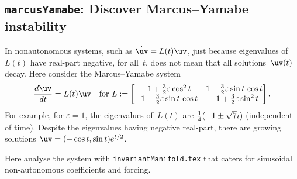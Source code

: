 \subsection{\texttt{marcusYamabe}: Discover Marcus--Yamabe instability}
\label{marcusYamabe}
\localtableofcontents

In {nonautonomous} systems, such as \(\dot{\uv}=L(t)\uv\),
just because eigenvalues of~\(L(t)\) have real-part
negative, for all~\(t\), does not mean that all
solutions~\(\uv(t)\) decay. Here consider the
{Marcus--Yamabe system} \cite[p.197]{Chicone2006}
\begin{equation}\label{eq:oscmyi}
\de t{\uv}=L(t)\uv \quad\text{for }L:=\begin{bmatrix} 
-1+\rat32\varepsilon\cos^2 t & 1-\rat32\varepsilon\sin t\,\cos t\\
-1-\rat32\varepsilon\sin t\,\cos t&-1+\rat32\varepsilon\sin^2t
\end{bmatrix}.
\end{equation}
For example, for \(\varepsilon=1\), the eigenvalues
of~\(L(t)\) are \({\tfrac{1}{4}}(-1\pm\sqrt7i)\) (independent of
time). Despite the eigenvalues having negative real-part,
there are growing solutions \(\uv=(-\cos t,\sin t)e^{t/2}\).

Here analyse the system with 
\verb|invariantManifold.tex| that caters for sinusoidal
non-autonomous coefficients and forcing.   

